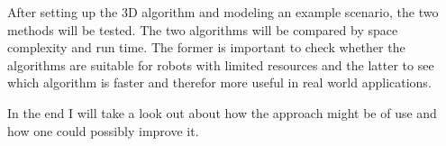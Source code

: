 \documentclass[Thesis.tex]{subfiles}
\begin{document}
After setting up the 3D algorithm and modeling an example scenario, the two methods will be tested. The two algorithms will be compared by space complexity and run time. The former is important to check whether the algorithms are suitable for robots with limited resources and the latter to see which algorithm is faster and therefor more useful in real world applications. 

\bigskip 

In the end I will take a look out about how the approach might be of use and how one could possibly improve it.
\end{document}
